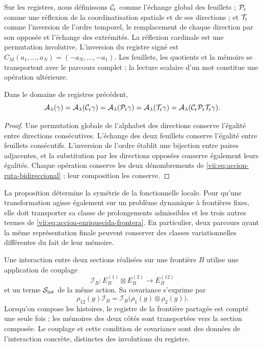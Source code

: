 Sur les registres, nous définissons \(\mathcal C_{\rm r}\) comme l'échange global des feuillets ; \(\mathcal P_{\rm r}\) comme une réflexion de la coordinatisation spatiale et de ses directions ; et \(\mathcal T_{\rm r}\) comme l'inversion de l'ordre temporel, le remplacement de chaque direction par son opposée et l'échange des extrémités. La réflexion cardinale est une permutation involutive. L'inversion du registre signé est \(C_M(a_1,\ldots,a_N)=(-a_N,\ldots,-a_1)\). Les feuillets, les quotients et la mémoire se transportent avec le parcours complet ; la lecture scalaire d'un mot constitue une opération ultérieure.

\begin{proposition}
\label{vii:prop:invariancia-ruta-bidireccional}
Dans le domaine de registres précédent,
\[
 \mathcal A_\lambda(\gamma)
 =\mathcal A_\lambda(\mathcal C_{\rm r}\gamma)
 =\mathcal A_\lambda(\mathcal P_{\rm r}\gamma)
 =\mathcal A_\lambda(\mathcal T_{\rm r}\gamma)
 =\mathcal A_\lambda(\mathcal C_{\rm r}\mathcal P_{\rm r}
                              \mathcal T_{\rm r}\gamma).
\]
\end{proposition}
\begin{proof}
Une permutation globale de l'alphabet des directions conserve l'égalité
entre directions consécutives. L'échange des deux feuillets conserve
l'égalité entre feuillets consécutifs. L'inversion de l'ordre établit une
bijection entre paires adjacentes, et la substitution par les directions opposées
conserve également leurs égalités. Chaque opération conserve les deux dénombrements
de \eqref{vii:eq:accion-ruta-bidireccional} ; leur composition les conserve.
\end{proof}

La proposition détermine la symétrie de la fonctionnelle locale. Pour qu'une transformation agisse également sur un problème dynamique à frontières fixes, elle doit transporter sa classe de prolongements admissibles et les trois autres termes de \eqref{vii:eq:accion-enriquecida-frontera}. En particulier, deux parcours ayant la même représentation finale peuvent conserver des classes variationnelles différentes du fait de leur mémoire.

Une interaction entre deux sections réalisées sur une frontière \(B\)
utilise une application de couplage
\[
 \mathcal I_B:E_B^{(1)}\otimes E_B^{(2)}\longrightarrow E_B^{(12)}
\]
et un terme \(\mathcal S_{\rm int}\) de la même action. Sa covariance s'exprime par
\[
 \rho_{12}(g)\mathcal I_B
 =\mathcal I_B\bigl(\rho_1(g)\otimes\rho_2(g)\bigr).
\]
Lorsqu'on compose les histoires, le registre de la frontière partagée est compté
une seule fois ; les mémoires des deux côtés sont transportées vers la section composée.
Le couplage et cette condition de covariance sont des données de l'interaction
concrète, distinctes des involutions du registre.

